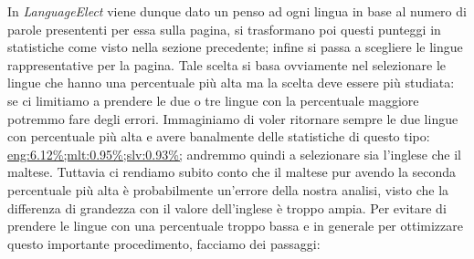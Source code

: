 \documentclass{article}
\newcommand{\class}[1]{\textit{#1}}
\newcommand{\mintedstyle}[1]{\url{#1}}
\begin{document}
In \class{LanguageElect} viene dunque dato un penso ad ogni lingua in base al numero di parole presententi per essa sulla pagina, si trasformano poi questi punteggi in statistiche come visto nella sezione precedente; infine si passa a scegliere le lingue rappresentative per la pagina.
Tale scelta si basa ovviamente nel selezionare le lingue che hanno una percentuale più alta ma la scelta deve essere più studiata: se ci limitiamo a prendere le due o tre lingue con la percentuale maggiore potremmo fare degli errori. Immaginiamo di voler ritornare sempre le due lingue con percentuale più alta e avere banalmente delle statistiche di questo tipo: \mintedstyle{eng:6.12\%;mlt:0.95\%;slv:0.93\%;} andremmo quindi a selezionare sia l'inglese che il maltese. Tuttavia ci rendiamo subito conto che il maltese pur avendo la seconda percentuale più alta è probabilmente un'errore della nostra analisi, visto che la differenza di grandezza con il valore dell'inglese è troppo ampia. Per evitare di prendere le lingue con una percentuale troppo bassa e in generale per ottimizzare questo importante procedimento, facciamo dei passaggi: 
\end{document}
